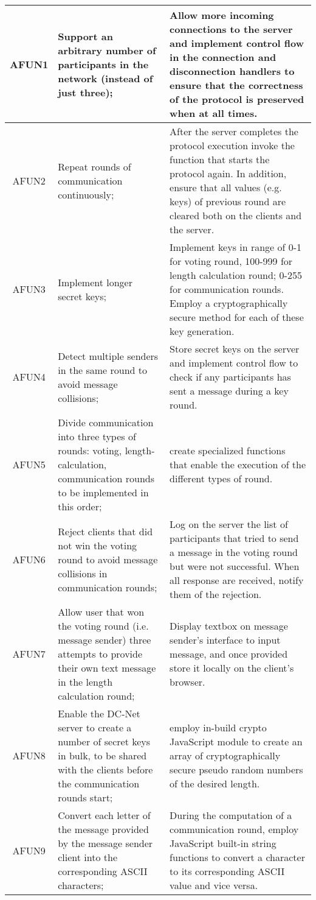 \begin{longtable}[c]{| c | p{4cm} | p{6cm} |}
\endlastfoot
AFUN1 & Support an arbitrary number of participants in the network (instead of just three); & Allow more incoming connections to the server and implement control flow in the connection and disconnection handlers to ensure that the correctness of the protocol is preserved when at all times.\\ 
\hline
AFUN2 & Repeat rounds of communication continuously; & After the server completes the protocol execution invoke the function that starts the protocol again. In addition, ensure that all values (e.g. keys) of previous round are cleared both on the clients and the server.\\
\hline
AFUN3 & Implement longer secret keys; & Implement keys in range of 0-1 for voting round, 100-999 for length calculation round; 0-255 for communication rounds. Employ a cryptographically secure method for each of these key generation.\\
\hline
AFUN4 & Detect multiple senders in the same round to avoid message collisions; & Store secret keys on the server and implement control flow to check if any participants has sent a message during a key round.\\
\hline
AFUN5 & Divide communication into three types of rounds: voting, length-calculation, communication rounds to be implemented in this order; & create specialized functions that enable the execution of the different types of round.\\
\hline
AFUN6 & Reject clients that did not win the voting round to avoid message collisions in communication rounds; & Log on the server the list of participants that tried to send a message in the voting round but were not successful. When all response are received, notify them of the rejection.\\
\hline
AFUN7 & Allow user that won the voting round (i.e. message sender) three attempts to provide their own text message in the length calculation round; & Display textbox on message sender's interface to input message, and once provided store it locally on the client's browser.\\
\hline
AFUN8 & Enable the DC-Net server to create a number of secret keys in bulk, to be shared with the clients before the communication rounds start; & employ in-build crypto JavaScript module to create an array of cryptographically secure pseudo random numbers of the desired length. \\
\hline
AFUN9 & Convert each letter of the message provided by the message sender client into the corresponding ASCII characters; & During the computation of a communication round, employ JavaScript built-in string functions to convert a character to its corresponding ASCII value and vice versa.\\

\end{longtable}
